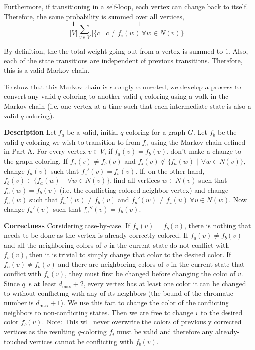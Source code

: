 \documentclass[12pt,twoside]{article}
\begin{document}
\begin{problems}
\begin{problemparts}
\begin{itemize}
  Furthermore, if transitioning in a self-loop, each vertex can change back
  to itself. Therefore, the same probability is summed over all vertices,
  $$ \frac{1}{|V|} \sum_{v \in V} \frac{1}{|\{c \mid c \neq f_i(w)\ \forall w
  \in N(v)\}|} $$
\end{itemize}

By definition, the the total weight going out from a vertex is summed to $1$.
Also, each of the state transitions are independent of previous transitions.
Therefore, this is a valid Markov chain.

\problempart %

To show that this Markov chain is strongly connected, we develop a process to
convert any valid $q$-coloring to another valid $q$-coloring using a walk in
the Markov chain (i.e. one vertex at a time such that each intermediate state
is also a valid $q$-coloring).

{\bf Description} Let $f_a$ be a valid, initial $q$-coloring for a graph $G$.
Let $f_b$ be the valid $q$-coloring we wish to transition to from $f_a$ using
the Markov chain defined in Part A. For every vertex $v \in V$, if $f_a(v) =
f_b(v)$, don't make a change to the graph coloring. If $f_a(v) \neq f_b(v)$
and $f_b(v) \not\in \{f_a(w) \mid\ \forall w \in N(v)\}$, change $f_a(v)$
such that $f_a'(v) = f_b(v)$. If, on the other hand, $f_b(v) \in \{f_a(w)
\mid\ \forall w \in N(v)\}$, find all vertices $w \in N(v)$ such that $f_a(w)
= f_b(v)$ (i.e. the conflicting colored neighbor vertex) and change $f_a(w)$
such that $f_a'(w) \neq f_b(v)$ and $f_a'(w) \neq f_a(u)\ \forall u \in
N(w)$. Now change $f_a'(v)$ such that $f_a''(v) = f_b(v)$.

{\bf Correctness} Considering case-by-case. If $f_a(v) = f_b(v)$, there is
nothing that needs to be done as the vertex is already correctly colored. If
$f_a(v) \neq f_b(v)$ and all the neighboring colors of $v$ in the current
state do not conflict with $f_b(v)$, then it is trivial to simply change that
color to the desired color. If $f_a(v) \neq f_b(v)$ and there are neighboring
colors of $v$ in the current state that conflict with $f_b(v)$, they must
first be changed before changing the color of $v$. Since $q$ is at least
$d_{\mathrm{max}} + 2$, every vertex has at least one color it can be changed
to without conflicting with any of its neighbors (the bound of the chromatic
number is $d_{\mathrm{max}} + 1$). We use this fact to change the color of
the conflicting neighbors to non-conflicting states. Then we are free to
change $v$ to the desired color $f_b(v)$. Note: This will never overwrite the
colors of previously corrected vertices as the resulting $q$-coloring $f_b$
must be valid and therefore any already-touched vertices cannot be
conflicting with $f_b(v)$.


\end{problemparts}
\end{problems}
\end{document}
